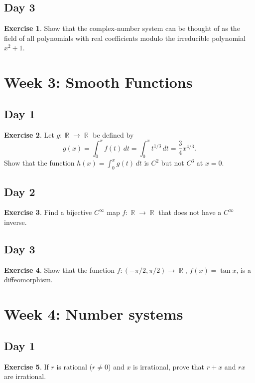 \documentclass{article}
\theoremstyle{definition}
\newtheorem*{exercise}{Exercise}
\DeclareMathOperator{\R}{\mathbb{R}}
\begin{document}
\subsection*{Day 3}
\begin{exercise}
    Show that the complex-number system can be thought of as the field of all polynomials with real coefficients modulo the irreducible polynomial \(x^2+1\).
\end{exercise}

\section*{Week 3: Smooth Functions}

\subsection*{Day 1}
\begin{exercise}
    Let \(g:\R\to\R\) be defined by
    \[g(x)=\int_0^x f(t)\,dt=\int_0^x t^{1/3}\,dt=\frac{3}{4}x^{4/3}.\]
    Show that the function \(h(x)=\int_0^x g(t)\,dt\) is \(C^2\) but not \(C^3\) at \(x=0\).
\end{exercise}

\subsection*{Day 2}
\begin{exercise}
    Find a bijective \(C^\infty\) map \(f:\R\to\R\) that does not have a \(C^\infty\) inverse.
\end{exercise}

\subsection*{Day 3}
\begin{exercise}
    Show that the function \(f:(-\pi/2,\pi/2)\to\R\), \(f(x)=\tan x\), is a diffeomorphism.
\end{exercise}

\section*{Week 4: Number systems}

\subsection*{Day 1}
\begin{exercise}
    If \(r\) is rational (\(r\neq0\)) and \(x\) is irrational, prove that \(r+x\) and \(rx\) are irrational.
\end{exercise}
\end{document}
